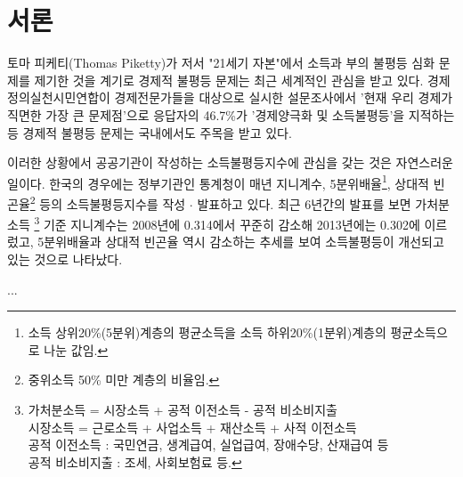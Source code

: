\chapter{서론}	
		
	토마 피케티(Thomas Piketty)\cite{piketty:1}\cite{piketty:2}가 
	저서 "21세기 자본"에서 소득과 부의 
	불평등 심화 문제를 제기한 것을 계기로 경제적 불평등 문제는 
	최근 세계적인 관심을 받고 있다. 
	경제정의실천시민연합이 경제전문가들을 대상으로 실시한 설문조사에서
	'현재 우리 경제가 직면한 가장 큰 문제점'으로 
	응답자의 46.7\%가 '경제양극화 및 소득불평등'을 지적하는 등
	경제적 불평등 문제는 국내에서도 주목을 받고 있다. 
	
	이러한 상황에서 공공기관이 작성하는 소득불평등지수에 관심을 갖는 것은 
	자연스러운 일이다.
	한국의 경우에는 정부기관인 통계청이 매년 지니계수, 
	5분위배율\footnote{소득 상위20\%(5분위)계층의 평균소득을 
	소득 하위20\%(1분위)계층의 평균소득으로 나눈 값임.}, 
	상대적 빈곤율\footnote{중위소득 50\% 미만 계층의 비율임.} 
	등의 소득불평등지수를 작성 $\cdot$ 발표하고 있다. 
	최근 6년간의 발표를 보면 가처분소득
	\footnote{가처분소득 = 시장소득 + 공적 이전소득 - 공적 비소비지출 \\
			  시장소득 = 근로소득 + 사업소득 + 재산소득 + 사적 이전소득 \\
			  공적 이전소득 : 국민연금, 생계급여, 실업급여, 장애수당, 산재급여 등 \\
			  공적 비소비지출 : 조세, 사회보험료 등.}
	기준 지니계수는 2008년에 0.314에서 꾸준히 감소해 2013년에는 0.302에 이르렀고,
	5분위배율과 상대적 빈곤율 역시 감소하는 추세를 보여 소득불평등이 개선되고 
	있는 것으로 나타났다.
	
	...
